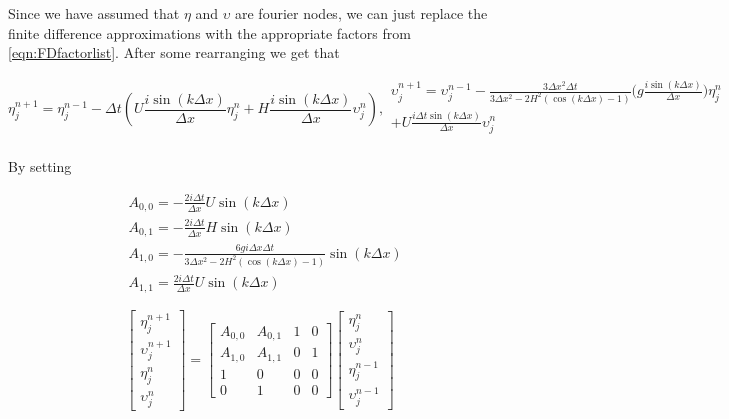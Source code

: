 Since we have assumed that $\eta$ and $\upsilon$ are fourier nodes, we can just replace the finite difference approximations with the appropriate factors from \eqref{eqn:FDfactorlist}. After some rearranging we get that


\begin{subequations}
	\begin{equation}
	\eta^{n+1}_j = \eta^{n-1}_j - \Delta t \left(U  \frac{i \sin\left(k \Delta x\right)}{\Delta x}\eta^n_j + H\frac{i \sin\left(k \Delta x\right)}{\Delta x} \upsilon^n_j \right),
	\end{equation}
	\begin{multline}
	\upsilon^{n+1}_j  =  \upsilon^{n-1}_j  -  \frac{3 \Delta x^2\Delta t}{3 \Delta x^2 -2{H^2} \left( \cos\left(k \Delta x\right) - 1 \right)}\bigg( g \frac{i \sin\left(k \Delta x\right)}{\Delta x}     \bigg) \eta^n_j\\ + U\frac{i \Delta t \sin\left(k \Delta x\right)}{\Delta x} \upsilon^n_j  \\
	\end{multline}
\end{subequations}

By setting

\begin{align}
&A_{0,0} = -  \frac{2 i\Delta t }{\Delta x} U\sin\left(k \Delta x\right)\\
&A_{0,1} = -  \frac{2 i\Delta t}{\Delta x} H \sin\left(k \Delta x\right) \\
&A_{1,0} = -\frac{6 gi \Delta x\Delta t}{3 \Delta x^2 -2{H^2} \left( \cos\left(k \Delta x\right) - 1 \right)}{ \sin\left(k \Delta x\right)} \\
&A_{1,1} =\frac{2i \Delta t }{\Delta x} U \sin\left(k \Delta x\right)
\end{align}


\begin{equation}
\begin{bmatrix}
\eta^{n+1}_j \\
\upsilon^{n+1}_j\\
\eta^{n}_j \\
\upsilon^{n}_j
\end{bmatrix} = 
\begin{bmatrix}
A_{0,0}  & A_{0,1}  & 1 &0 \\
A_{1,0}  & A_{1,1}  & 0 &1 \\
1  & 0  &0 &0 \\
0  & 1  &0 &0 
\end{bmatrix} \begin{bmatrix}
\eta^{n}_j \\
\upsilon^{n}_j\\
\eta^{n-1}_j \\
\upsilon^{n-1}_j
\end{bmatrix}
\end{equation}

